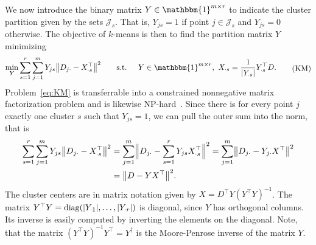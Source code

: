 We now introduce the binary matrix $Y\in\mathbbm{1}^{m\times r}$ to indicate the cluster partition given by the sets $\mathcal{J}_s$. That is, $Y_{js}=1$ if point $j\in \mathcal{J}_s$ and $Y_{js}=0$ otherwise. The objective of $k$-means is then to find the partition matrix $Y$ minimizing
\begin{equation}
\begin{aligned}
\min_Y &\sum_{s=1}^r\sum_{j=1}^mY_{js}\bigl\lVert D_{j\cdot}-X_{\cdot s}^\top\bigr\rVert ^2\qquad
\text{s.t. } & Y\in \mathbbm{1}^{m\times r},\ X_{\cdot s} = \frac{1}{\lvert Y_{\cdot s}\rvert }Y_{\cdot s}^\top D. 
\end{aligned}
\tag{KM}\label{eq:KM}
\end{equation} 
Problem~\eqref{eq:KM} is transferrable into a constrained nonnegative matrix factorization problem and is likewise NP-hard~\citep{aloise2009np}. Since there is for every point $j$ exactly one cluster $s$ such that $Y_{js}=1$, we can pull the outer sum into the norm, that is
\begin{align*}
\sum_{s=1}^r\sum_{j=1}^mY_{js}\bigl\lVert D_{j\cdot}-X_{\cdot s}^\top\bigr\rVert ^2
&= \sum_{j=1}^m\Bigl\lVert D_{j\cdot}-\sum_{s=1}^rY_{js}X_{\cdot s}^\top\Bigr\rVert ^2
= \sum_{j=1}^m\bigl\lVert D_{j\cdot}-Y_{j\cdot}X^\top\bigr\rVert ^2\\
&=\bigl\lVert D-YX^\top\bigr\rVert ^2.
\end{align*}
The cluster centers are in matrix notation given by $X=D^\top Y \left(Y^\top Y\right)^{-1}$. 
The matrix $Y^\top Y=\operatorname{diag}(\lvert Y_{\cdot 1}\rvert ,\ldots, \lvert Y_{\cdot r}\rvert )$ is diagonal, since $Y$ has orthogonal columns. Its inverse is easily computed by inverting the elements on the diagonal. Note, that the matrix $\left(Y^\top Y\right)^{-1}Y^\top=Y^\dagger$ is the Moore-Penrose inverse of the matrix $Y$.

